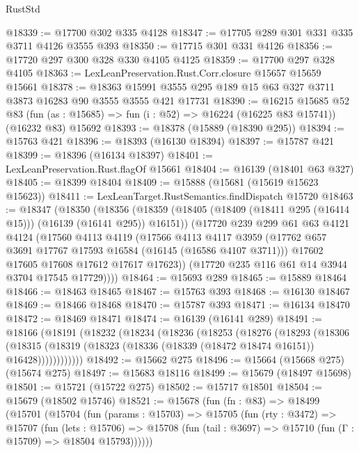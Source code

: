\begin{lexlean}{RustStd}
\begin{coremodule}
@18339 := @17700 @302 @335 @4128
@18347 := @17705 @289 @301 @331 @335 @3711 @4126 @3555 @393
@18350 := @17715 @301 @331 @4126
@18356 := @17720 @297 @300 @328 @330 @4105 @4125
@18359 := @17700 @297 @328 @4105
@18363 := LexLeanPreservation.Rust.Corr.closure @15657 @15659 @15661
@18378 := @18363 @15991 @3555 @295 @189 @15 @63 @327 @3711 @3873 @16283 @90 @3555 @3555 @421 @17731
@18390 := @16215
    @15685
    @52
    @83
    (fun (as : @15685) => fun (i : @52) => @16224 (@16225 @83 @15741))
    (@16232 @83)
    @15692
@18393 := @18378 (@15889 (@18390 @295))
@18394 := @15763 @421
@18396 := @18393 (@16130 @18394)
@18397 := @15787 @421
@18399 := @18396 (@16134 @18397)
@18401 := LexLeanPreservation.Rust.flagOf @15661
@18404 := @16139 (@18401 @63 @327)
@18405 := @18399 @18404
@18409 := @15888 (@15681 (@15619 @15623 @15623))
@18411 := LexLeanTarget.RustSemantics.findDispatch @15720
@18463 := @18347
    (@18350
      (@18356
        (@18359 (@18405 (@18409 (@18411 @295 (@16414 @15))) (@16139 (@16141 @295)) @16151))
        (@17720
          @239
          @299
          @61
          @63
          @4121
          @4124
          (@17560
            @4113
            @4119
            (@17566
              @4113
              @4117
              @3959
              (@17762 @657 @3691 @17767 @17593 @16584 (@16145 (@16586 @4107 @3711)))
              @17602
              @17605
              @17608
              @17612
              @17617
              @17623))
          (@17720 @235 @116 @61 @14 @3944 @3704 @17545 @17729))))
@18464 := @15693 @289
@18465 := @15889 @18464
@18466 := @18463 @18465
@18467 := @15763 @393
@18468 := @16130 @18467
@18469 := @18466 @18468
@18470 := @15787 @393
@18471 := @16134 @18470
@18472 := @18469 @18471
@18474 := @16139 (@16141 @289)
@18491 := @18166
    (@18191
      (@18232
        (@18234
          (@18236
            (@18253
              (@18276
                (@18293
                  (@18306
                    (@18315
                      (@18319 (@18323 (@18336 (@18339 (@18472 @18474 @16151)) @16428))))))))))))
@18492 := @15662 @275
@18496 := @15664 (@15668 @275) (@15674 @275)
@18497 := @15683 @18116
@18499 := @15679 (@18497 @15698)
@18501 := @15721 (@15722 @275)
@18502 := @15717 @18501
@18504 := @15679 (@18502 @15746)
@18521 := @15678
    (fun (fn : @83) =>
    @18499
      (@15701
        (@15704
          (fun (params : @15703) =>
          @15705
            (fun (rty : @3472) =>
            @15707
              (fun (lets : @15706) =>
              @15708 (fun (tail : @3697) => @15710 (fun (Γ : @15709) => @18504 @15793))))))

\end{coremodule}
\end{lexlean}
